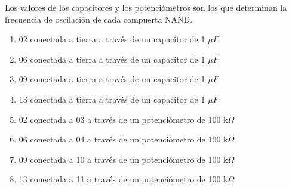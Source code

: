 \documentclass[../principal.tex]{subfiles}
\begin{document}
Los valores de los capacitores y los potenciómetros son los que determinan la frecuencia de oscilación de cada compuerta NAND.

\begin{enumerate}
    \item 02 conectada a tierra a través de un capacitor de 1 $\mu F$
    \item 06 conectada a tierra a través de un capacitor de 1 $\mu F$
    \item 09 conectada a tierra a través de un capacitor de 1 $\mu F$
    \item 13 conectada a tierra a través de un capacitor de 1 $\mu F$
    \item 02 conectada a 03 a través de un potenciómetro de 100 k$\Omega$
    \item 06 conectada a 04 a través de un potenciómetro de 100 k$\Omega$
    \item 09 conectada a 10 a través de un potenciómetro de 100 k$\Omega$
    \item 13 conectada a 11 a través de un potenciómetro de 100 k$\Omega$
\end{enumerate}

\newpage
\end{document}
